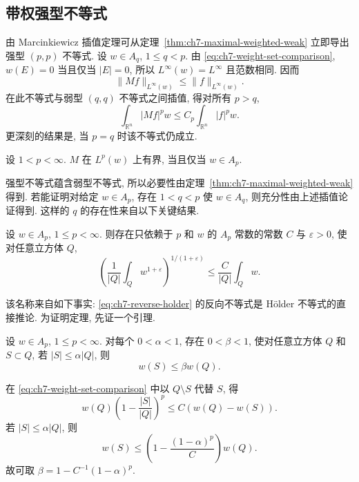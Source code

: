 \subsection{带权强型不等式}
\label{sec:ch7-strong-weighted}

由 Marcinkiewicz 插值定理可从定理~\ref{thm:ch7-maximal-weighted-weak} 立即导出强型 $(p,p)$ 不等式. 设 $w\in A_q$, $1\le q<p$. 由 \eqref{eq:ch7-weight-set-comparison}, $w(E)=0$ 当且仅当 $|E|=0$, 所以 $L^\infty(w)=L^\infty$ 且范数相同. 因而
\[
 \|Mf\|_{L^\infty(w)}\le\|f\|_{L^\infty(w)}.
\]
在此不等式与弱型 $(q,q)$ 不等式之间插值, 得对所有 $p>q$,
\begin{equation}
\label{eq:ch7-maximal-weighted-strong}
 \int_{\mathbb R^n}|Mf|^pw\le C_p\int_{\mathbb R^n}|f|^pw.
\end{equation}
更深刻的结果是, 当 $p=q$ 时该不等式仍成立.

\begin{Theorem}
\label{thm:ch7-maximal-weighted-strong}
设 $1<p<\infty$. $M$ 在 $L^p(w)$ 上有界, 当且仅当 $w\in A_p$.
\end{Theorem}

强型不等式蕴含弱型不等式, 所以必要性由定理~\ref{thm:ch7-maximal-weighted-weak} 得到. 若能证明对给定 $w\in A_p$, 存在 $1<q<p$ 使 $w\in A_q$, 则充分性由上述插值论证得到. 这样的 $q$ 的存在性来自以下关键结果.

\begin{Theorem}
\label{thm:ch7-reverse-holder}
设 $w\in A_p$, $1\le p<\infty$. 则存在只依赖于 $p$ 和 $w$ 的 $A_p$ 常数的常数 $C$ 与 $\varepsilon>0$, 使对任意立方体 $Q$,
\begin{equation}
\label{eq:ch7-reverse-holder}
 \left(\frac1{|Q|}\int_Qw^{1+\varepsilon}\right)^{1/(1+\varepsilon)}
 \le\frac C{|Q|}\int_Qw.
\end{equation}
\end{Theorem}

该名称来自如下事实: \eqref{eq:ch7-reverse-holder} 的反向不等式是 Hölder 不等式的直接推论. 为证明定理, 先证一个引理.

\hypertarget{chapter-07-page-150}{}
\begin{Lemma}
\label{lem:ch7-small-set-weight-decay}
设 $w\in A_p$, $1\le p<\infty$. 对每个 $0<\alpha<1$, 存在 $0<\beta<1$, 使对任意立方体 $Q$ 和 $S\subset Q$, 若 $|S|\le\alpha|Q|$, 则
\[
 w(S)\le\beta w(Q).
\]
\end{Lemma}

\begin{Proof}
在 \eqref{eq:ch7-weight-set-comparison} 中以 $Q\setminus S$ 代替 $S$, 得
\[
 w(Q)\left(1-\frac{|S|}{|Q|}\right)^p
 \le C(w(Q)-w(S)).
\]
若 $|S|\le\alpha|Q|$, 则
\[
 w(S)\le\left(1-\frac{(1-\alpha)^p}{C}\right)w(Q).
\]
故可取 $\beta=1-C^{-1}(1-\alpha)^p$.
\end{Proof}


